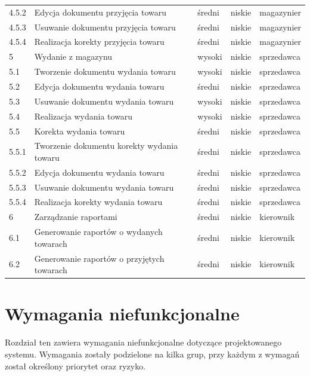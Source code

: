\begin{table}[ht]
\begin{center}
\begin{tabular}{| l | l | l | l | l |}
            4.5.2 & Edycja dokumentu przyjęcia towaru & średni & niskie & magazynier \\
            4.5.3 & Usuwanie dokumentu przyjęcia towaru & średni & niskie & magazynier \\
            4.5.4 & Realizacja korekty przyjęcia towaru & średni & niskie & magazynier \\ 
            \hline
		   	5 & Wydanie z magazynu & wysoki & niskie & sprzedawca \\
		   	5.1 & Tworzenie dokumentu wydania towaru & wysoki & niskie & sprzedawca \\
		   	5.2 & Edycja dokumentu wydania towaru & średni & niskie & sprzedawca \\
		   	5.3 & Usuwanie dokumentu wydania towaru & wysoki & niskie & sprzedawca \\
		   	5.4 & Realizacja wydania towaru & wysoki & niskie & sprzedawca \\
		   	5.5 & Korekta wydania towaru & średni & niskie & sprzedawca \\
            5.5.1 & Tworzenie dokumentu korekty wydania towaru & średni & niskie & sprzedawca \\
            5.5.2 & Edycja dokumentu wydania towaru & średni & niskie & sprzedawca \\
            5.5.3 & Usuwanie dokumentu wydania towaru & średni & niskie & sprzedawca \\
            5.5.4 & Realizacja korekty wydania towaru & średni & niskie & sprzedawca \\ 
		   	\hline
		   	6 & Zarządzanie raportami & średni & niskie & kierownik \\
		   	6.1 & Generowanie raportów o wydanych towarach & średni & niskie & kierownik \\
		   	6.2 & Generowanie raportów o przyjętych towarach & średni & niskie & kierownik \\
		   	\hline
	    \end{tabular}
	\end{center}
\end{table}
\FloatBarrier

\section{Wymagania niefunkcjonalne}

Rozdział ten zawiera wymagania niefunkcjonalne dotyczące projektowanego systemu.
Wymagania zostały podzielone na kilka grup, przy każdym z wymagań został
określony priorytet oraz ryzyko.

